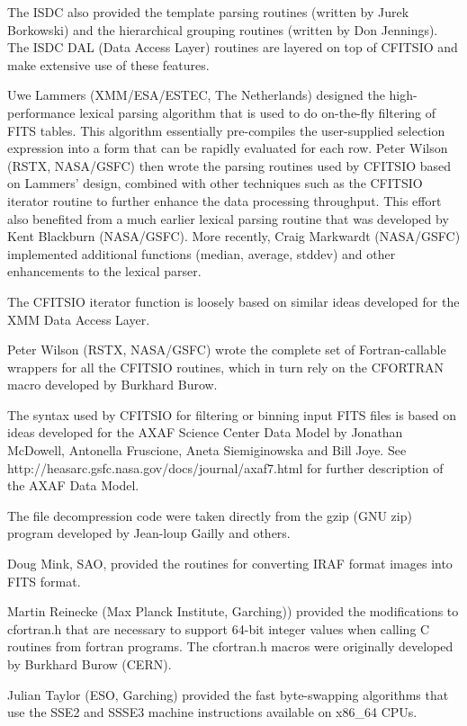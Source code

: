 \documentclass[11pt]{book}
\begin{document}
The ISDC also provided the template parsing routines (written by Jurek
Borkowski) and the hierarchical grouping routines (written by Don
Jennings).  The ISDC DAL (Data Access Layer) routines are layered on
top of CFITSIO and make extensive use of these features.

Uwe Lammers (XMM/ESA/ESTEC, The Netherlands) designed the
high-performance lexical parsing algorithm that is used to do
on-the-fly filtering of FITS tables.  This algorithm essentially
pre-compiles the user-supplied selection expression into a form that
can be rapidly evaluated for each row.  Peter Wilson (RSTX, NASA/GSFC)
then wrote the parsing routines used by CFITSIO based on Lammers'
design, combined with other techniques such as the CFITSIO iterator
routine to further enhance the data processing throughput.  This effort
also benefited from a much earlier lexical parsing routine that was
developed by Kent Blackburn (NASA/GSFC). More recently, Craig Markwardt
(NASA/GSFC) implemented additional functions (median, average, stddev)
and other enhancements to the lexical parser.

The CFITSIO iterator function is loosely based on similar ideas
developed for the XMM Data Access Layer.

Peter Wilson (RSTX, NASA/GSFC) wrote the complete set of
Fortran-callable wrappers for all the CFITSIO routines, which in turn
rely on the CFORTRAN macro developed by Burkhard Burow.

The syntax used by CFITSIO for filtering or binning input FITS files is
based on ideas developed for the AXAF Science Center Data Model by
Jonathan McDowell, Antonella Fruscione, Aneta Siemiginowska and Bill
Joye. See http://heasarc.gsfc.nasa.gov/docs/journal/axaf7.html for
further description of the AXAF Data Model.

The file decompression code were taken directly from the gzip (GNU zip)
program developed by Jean-loup Gailly and others.

Doug Mink, SAO, provided the routines for converting IRAF format
images into FITS format.

Martin Reinecke (Max Planck Institute, Garching)) provided the modifications to
cfortran.h that are necessary to support 64-bit integer values when calling
C routines from fortran programs.  The cfortran.h macros were originally developed
by Burkhard Burow (CERN).

Julian Taylor (ESO, Garching) provided the fast byte-swapping algorithms
that use the SSE2 and SSSE3 machine instructions available on x86\_64 CPUs.
\end{document}
